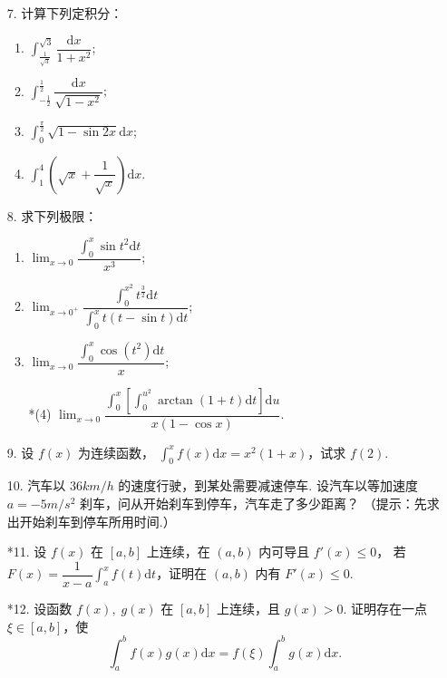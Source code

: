 \begin{enumerate}
    \item[7.] 计算下列定积分：
    \begin{enumerate}[(1)]\setlength{\itemsep}{5pt}\setlength{\topsep}{15pt}
        \item $\displaystyle \int_{\frac{1}{\sqrt{3}}}^{\sqrt{3}}\dfrac{\text{d}x}{1+x^2}$;
        \item $\displaystyle \int_{-\frac{1}{2}}^{\frac{1}{2}}\dfrac{\text{d}x}{\sqrt{1-x^2}}$;
        \item $\displaystyle \int_{0}^{\frac{\pi}{2}}\sqrt{1-\sin 2x}\text{d}x$;
        \item $\displaystyle \int_1^4\left(\sqrt{x}+\dfrac{1}{\sqrt{x}}\right)\text{d}x$.
    \end{enumerate}

    \item[8.] 求下列极限：
    \begin{enumerate}[(1)]\setlength{\itemsep}{5pt}\setlength{\topsep}{15pt}
        \item $\displaystyle \lim_{x\to0}\dfrac{\displaystyle\int_0^x\sin t^2\text{d}t}{x^3}$;
        \item $\displaystyle \lim_{x\to0^{+}}\dfrac{\displaystyle\int_0^{x^2}t^{\frac{3}{2}}\text{d}t}{\displaystyle\int_0^xt(t-\sin t)\text{d}t}$;
        \item $\displaystyle \lim_{x\to0}\dfrac{\displaystyle\int_0^x\cos(t^2)\text{d}t}{x}$;
        \item[*(4)] $\displaystyle \lim_{x\to0}\dfrac{\displaystyle\int_0^x\left[\int_0^{u^2}\arctan(1+t)\text{d}t\right]\text{d}u}{x(1-\cos x)}$.
    \end{enumerate}

    \item[9.] 设 $f(x)$ 为连续函数，
    $\displaystyle \int_0^xf(x)\text{d}x=x^2(1+x)$，试求 $f(2)$.

    \item[10.] 汽车以 $36 km/h$ 的速度行驶，到某处需要减速停车. 
    设汽车以等加速度 $a=-5m/s^2$ 刹车，问从开始刹车到停车，汽车走了多少距离？
    （提示：先求出开始刹车到停车所用时间.）

    \item[*11.] 设 $f(x)$ 在 $[a,b]$ 上连续，在 $(a,b)$ 内可导且 $f'(x)\leqslant 0$，
    若 $\displaystyle F(x)=\dfrac{1}{x-a}\int_a^xf(t)\text{d}t$，证明在 $(a,b)$ 内有 $F'(x)\leqslant 0$.

    \item[*12.] 设函数 $f(x),\;g(x)$ 在 $[a,b]$ 上连续，且 $g(x)>0$. 证明存在一点 $\xi\in[a,b]$，使
    \[
        \int_a^bf(x)g(x)\text{d}x=f(\xi)\int_a^bg(x)\text{d}x.
    \]
    

\end{enumerate}
